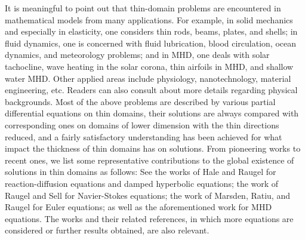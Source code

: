 \documentclass[10pt,reqno]{amsart}
\numberwithin{equation}{section}
\begin{document}
It is meaningful to point out that thin-domain problems are encountered in  mathematical models  from many applications.
 For example, in  solid mechanics and especially in elasticity, one considers thin rods, beams, plates, and shells; in fluid dynamics, one is concerned with fluid lubrication, blood circulation,  ocean dynamics, and meteorology  problems; 
  and in MHD, one deals with  solar tachocline, 
 wave heating in the solar corona, thin airfoils in MHD, and shallow water MHD. Other  applied areas   include physiology, nanotechnology, material engineering, etc.  Readers can also consult  \cite{Raugel,Hale-Raugel} about more details regarding physical backgrounds. Most of the above problems are described by various 
partial differential equations on thin domains, their  solutions are always compared with corresponding ones on 
domains of  lower dimension with the thin directions reduced, 
 and a fairly satisfactory understanding has been achieved for
 what impact the thickness of thin domains has on solutions. 
From pioneering works to recent ones, we list some representative 
contributions to the global existence of solutions in thin domains as follows: See the works  of Hale and Raugel \cite{Hale-Raugel-JMPA,Hale-Raugel-TAMS} for reaction-diffusion equations and damped hyperbolic equations; the work of Raugel and Sell \cite{Raugel-Sell-1} for Navier-Stokes equations;  the work of Marsden, Ratiu, and Raugel \cite{Marsden-Ratiu-Raugel}  for Euler equations; as well as the aforementioned work \cite{Xu}   for MHD equations.   The works  \cite{Prizzi-Rybakowski-2,Iftimie-Raugel,Cai-Wang,Elsken-Prizzi} and 
 their related references, in which more equations are considered or further results obtained, are also relevant. 

 
\end{document}
